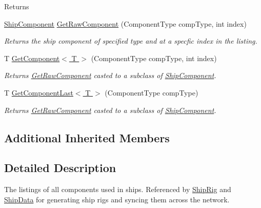 \begin{DoxyCompactItemize}
\begin{DoxyCompactList}
\begin{DoxyReturn}{Returns}
\end{DoxyReturn}
 \end{DoxyCompactList}\item 
\hyperlink{class_skyrates_1_1_ship_1_1_ship_component}{Ship\-Component} \hyperlink{class_skyrates_1_1_ship_1_1_ship_component_list_a2bbeb0e895095601c7a70fb3954f6c17}{Get\-Raw\-Component} (Component\-Type comp\-Type, int index)
\begin{DoxyCompactList}\small\item\em Returns the ship component of specified type and at a specfic index in the listing. \end{DoxyCompactList}\item 
T \hyperlink{class_skyrates_1_1_ship_1_1_ship_component_list_aec118a46c41449adc8e75b12d8157ab5}{Get\-Component$<$ T $>$} (Component\-Type comp\-Type, int index)
\begin{DoxyCompactList}\small\item\em Returns \hyperlink{class_skyrates_1_1_ship_1_1_ship_component_list_a2bbeb0e895095601c7a70fb3954f6c17}{Get\-Raw\-Component} casted to a subclass of \hyperlink{class_skyrates_1_1_ship_1_1_ship_component}{Ship\-Component}. \end{DoxyCompactList}\item 
T \hyperlink{class_skyrates_1_1_ship_1_1_ship_component_list_ab263c72982792f3145edfc20f958179d}{Get\-Component\-Last$<$ T $>$} (Component\-Type comp\-Type)
\begin{DoxyCompactList}\small\item\em Returns \hyperlink{class_skyrates_1_1_ship_1_1_ship_component_list_a2bbeb0e895095601c7a70fb3954f6c17}{Get\-Raw\-Component} casted to a subclass of \hyperlink{class_skyrates_1_1_ship_1_1_ship_component}{Ship\-Component}. \end{DoxyCompactList}\end{DoxyCompactItemize}
\subsection*{Additional Inherited Members}


\subsection{Detailed Description}
The listings of all components used in ships. Referenced by \hyperlink{class_skyrates_1_1_ship_1_1_ship_rig}{Ship\-Rig} and \hyperlink{class_skyrates_1_1_ship_1_1_ship_data}{Ship\-Data} for generating ship rigs and syncing them across the network. 



